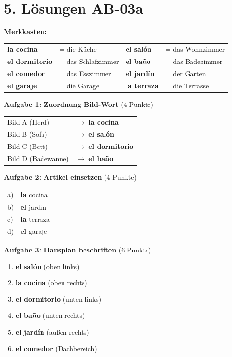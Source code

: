 \documentclass[11pt, a4paper]{article}
\newcommand{\fachfarbe}{spanisch}
\newcommand{\loesung}[1]{\textcolor{loesung}{\textbf{#1}}}
\newcommand{\es}[1]{\textcolor{\fachfarbe}{\textbf{#1}}}
\begin{document}

\section*{5. Lösungen AB-03a}

\textbf{Merkkasten:}
\begin{tabular}{llll}
\es{la cocina} & = die Küche & \es{el salón} & = das Wohnzimmer \\
\es{el dormitorio} & = das Schlafzimmer & \es{el baño} & = das Badezimmer \\
\es{el comedor} & = das Esszimmer & \es{el jardín} & = der Garten \\
\es{el garaje} & = die Garage & \es{la terraza} & = die Terrasse \\
\end{tabular}

\vspace{1em}

\textbf{Aufgabe 1: Zuordnung Bild-Wort} (4 Punkte)

\begin{tabular}{ll}
Bild A (Herd) & $\rightarrow$ \loesung{la cocina} \\
Bild B (Sofa) & $\rightarrow$ \loesung{el salón} \\
Bild C (Bett) & $\rightarrow$ \loesung{el dormitorio} \\
Bild D (Badewanne) & $\rightarrow$ \loesung{el baño} \\
\end{tabular}

\vspace{1em}

\textbf{Aufgabe 2: Artikel einsetzen} (4 Punkte)

\begin{tabular}{ll}
a) & \loesung{la} cocina \\
b) & \loesung{el} jardín \\
c) & \loesung{la} terraza \\
d) & \loesung{el} garaje \\
\end{tabular}

\vspace{1em}

\textbf{Aufgabe 3: Hausplan beschriften} (6 Punkte)

\begin{enumerate}
    \item \loesung{el salón} (oben links)
    \item \loesung{la cocina} (oben rechts)
    \item \loesung{el dormitorio} (unten links)
    \item \loesung{el baño} (unten rechts)
    \item \loesung{el jardín} (außen rechts)
    \item \loesung{el comedor} (Dachbereich)
\end{enumerate}
\end{document}
